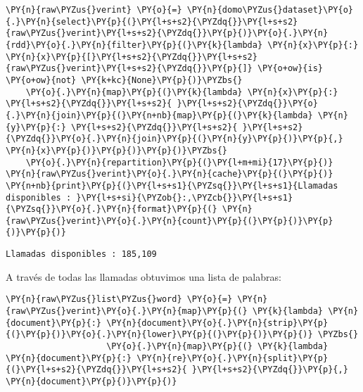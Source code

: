     \begin{tcolorbox}[breakable, size=fbox, boxrule=1pt, pad at break*=1mm,colback=cellbackground, colframe=cellborder]
\begin{Verbatim}[commandchars=\\\{\}]
\PY{n}{raw\PYZus{}verint} \PY{o}{=} \PY{n}{domo\PYZus{}dataset}\PY{o}{.}\PY{n}{select}\PY{p}{(}\PY{l+s+s2}{\PYZdq{}}\PY{l+s+s2}{raw\PYZus{}verint}\PY{l+s+s2}{\PYZdq{}}\PY{p}{)}\PY{o}{.}\PY{n}{rdd}\PY{o}{.}\PY{n}{filter}\PY{p}{(}\PY{k}{lambda} \PY{n}{x}\PY{p}{:} \PY{n}{x}\PY{p}{[}\PY{l+s+s2}{\PYZdq{}}\PY{l+s+s2}{raw\PYZus{}verint}\PY{l+s+s2}{\PYZdq{}}\PY{p}{]} \PY{o+ow}{is} \PY{o+ow}{not} \PY{k+kc}{None}\PY{p}{)}\PYZbs{}
    \PY{o}{.}\PY{n}{map}\PY{p}{(}\PY{k}{lambda} \PY{n}{x}\PY{p}{:} \PY{l+s+s2}{\PYZdq{}}\PY{l+s+s2}{ }\PY{l+s+s2}{\PYZdq{}}\PY{o}{.}\PY{n}{join}\PY{p}{(}\PY{n+nb}{map}\PY{p}{(}\PY{k}{lambda} \PY{n}{y}\PY{p}{:} \PY{l+s+s2}{\PYZdq{}}\PY{l+s+s2}{ }\PY{l+s+s2}{\PYZdq{}}\PY{o}{.}\PY{n}{join}\PY{p}{(}\PY{n}{y}\PY{p}{)}\PY{p}{,} \PY{n}{x}\PY{p}{)}\PY{p}{)}\PY{p}{)}\PYZbs{}
    \PY{o}{.}\PY{n}{repartition}\PY{p}{(}\PY{l+m+mi}{17}\PY{p}{)}
\PY{n}{raw\PYZus{}verint}\PY{o}{.}\PY{n}{cache}\PY{p}{(}\PY{p}{)}
\PY{n+nb}{print}\PY{p}{(}\PY{l+s+s1}{\PYZsq{}}\PY{l+s+s1}{Llamadas disponibles : }\PY{l+s+si}{\PYZob{}:,\PYZcb{}}\PY{l+s+s1}{\PYZsq{}}\PY{o}{.}\PY{n}{format}\PY{p}{(} \PY{n}{raw\PYZus{}verint}\PY{o}{.}\PY{n}{count}\PY{p}{(}\PY{p}{)}\PY{p}{)}\PY{p}{)}  
\end{Verbatim}
\end{tcolorbox}

    \begin{Verbatim}[commandchars=\\\{\}]
Llamadas disponibles : 185,109
    \end{Verbatim}
    
    
 A través de todas las llamadas obtuvimos una lista de palabras: 
    \vspace{0.5cm}
    
        \begin{tcolorbox}[breakable, size=fbox, boxrule=1pt, pad at break*=1mm,colback=cellbackground, colframe=cellborder]
    \begin{Verbatim}[commandchars=\\\{\}]
    \PY{n}{raw\PYZus{}list\PYZus{}word} \PY{o}{=} \PY{n}{raw\PYZus{}verint}\PY{o}{.}\PY{n}{map}\PY{p}{(} \PY{k}{lambda} \PY{n}{document}\PY{p}{:} \PY{n}{document}\PY{o}{.}\PY{n}{strip}\PY{p}{(}\PY{p}{)}\PY{o}{.}\PY{n}{lower}\PY{p}{(}\PY{p}{)}\PY{p}{)} \PYZbs{}
                    \PY{o}{.}\PY{n}{map}\PY{p}{(} \PY{k}{lambda} \PY{n}{document}\PY{p}{:} \PY{n}{re}\PY{o}{.}\PY{n}{split}\PY{p}{(}\PY{l+s+s2}{\PYZdq{}}\PY{l+s+s2}{ }\PY{l+s+s2}{\PYZdq{}}\PY{p}{,} \PY{n}{document}\PY{p}{)}\PY{p}{)}
    \end{Verbatim}
    \end{tcolorbox}
    
